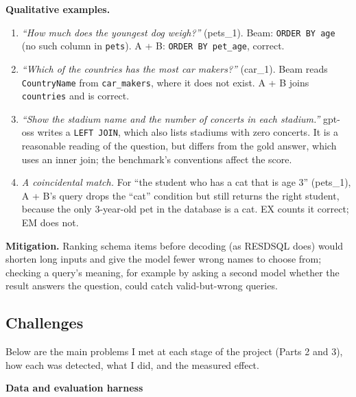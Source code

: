 \documentclass[
  10pt,
]{article}
\providecommand{\tightlist}{%
  \setlength{\itemsep}{0pt}\setlength{\parskip}{0pt}}
\begin{document}
\textbf{Qualitative examples.}

\begin{enumerate}
\def\labelenumi{\arabic{enumi}.}
\tightlist
\item
  \emph{``How much does the youngest dog weigh?''} (pets\_1). Beam:
  \texttt{ORDER\ BY\ age} (no such column in \texttt{pets}). A + B:
  \texttt{ORDER\ BY\ pet\_age}, correct.
\item
  \emph{``Which of the countries has the most car makers?''} (car\_1).
  Beam reads \texttt{CountryName} from \texttt{car\_makers}, where it
  does not exist. A + B joins \texttt{countries} and is correct.
\item
  \emph{``Show the stadium name and the number of concerts in each
  stadium.''} gpt-oss writes a \texttt{LEFT\ JOIN}, which also lists
  stadiums with zero concerts. It is a reasonable reading of the
  question, but differs from the gold answer, which uses an inner join;
  the benchmark's conventions affect the score.
\item
  \emph{A coincidental match.} For ``the student who has a cat that is
  age 3'' (pets\_1), A + B's query drops the ``cat'' condition but still
  returns the right student, because the only 3-year-old pet in the
  database is a cat. EX counts it correct; EM does not.
\end{enumerate}

\textbf{Mitigation.} Ranking schema items before decoding (as RESDSQL
does) would shorten long inputs and give the model fewer wrong names to
choose from; checking a query's meaning, for example by asking a second
model whether the result answers the question, could catch
valid-but-wrong queries.

\subsection{Challenges}\label{challenges}

Below are the main problems I met at each stage of the project (Parts 2
and 3), how each was detected, what I did, and the measured effect.

\textbf{Data and evaluation harness}
\end{document}
